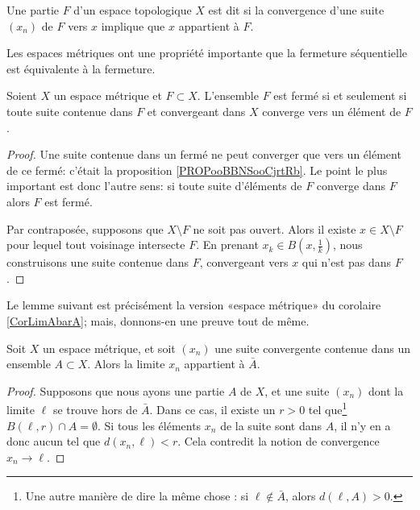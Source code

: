 \begin{definition}
    Une partie \( F\) d'un espace topologique \( X\) est dit  si la convergence d'une suite \( (x_n)\) de \( F\) vers \( x\) implique que \( x\) appartient à \( F\).
\end{definition}

Les espaces métriques ont une propriété importante que la fermeture séquentielle est équivalente à la fermeture.

\begin{proposition}    \label{PropLFBXIjt}
	Soient \( X\) un espace métrique et \( F\subset X\). L'ensemble \( F\) est fermé si et seulement si toute suite contenue dans \( F\) et convergeant dans \( X\) converge vers un élément de \( F\).
\end{proposition}

\begin{proof}
	Une suite contenue dans un fermé ne peut converger que vers un élément de ce fermé: c'était la proposition \ref{PROPooBBNSooCjrtRb}. Le point le plus important est donc l'autre sens: si toute suite d'éléments de \( F \) converge dans \( F \) alors \( F \) est fermé.

	Par contraposée, supposons que \( X\setminus F\) ne soit pas ouvert. Alors il existe \( x\in X\setminus F\) pour lequel tout voisinage intersecte \( F\). En prenant \( x_k\in B(x,\frac{1}{ k })\), nous construisons une suite contenue dans \( F\), convergeant vers \( x\) qui n'est pas dans \( F \).
\end{proof}


Le lemme suivant est précisément la version «espace métrique» du corolaire \ref{CorLimAbarA}; mais, donnons-en une preuve tout de même.
\begin{lemma}		\label{LemLimAbarA}
	Soit \( X\) un espace métrique, et soit \( (x_n)\) une suite convergente contenue dans un ensemble \( A\subset X\). Alors la limite \( x_n\) appartient à \( \bar A\).
\end{lemma}

\begin{proof}
	Supposons que nous ayons une partie \( A\) de \( X\), et une suite \( (x_n)\) dont la limite \( \ell\) se trouve hors de \( \bar A\). Dans ce cas, il existe un \( r>0\) tel que\footnote{Une autre manière de dire la même chose : si \( \ell\notin\bar A\), alors \( d(\ell,A)>0\).} \( B(\ell,r)\cap A=\emptyset\). Si tous les éléments \( x_n\) de la suite sont dans \( A\), il n'y en a donc aucun tel que \( d(x_n,\ell)<r\). Cela contredit la notion de convergence \( x_n\to \ell\).
\end{proof}

